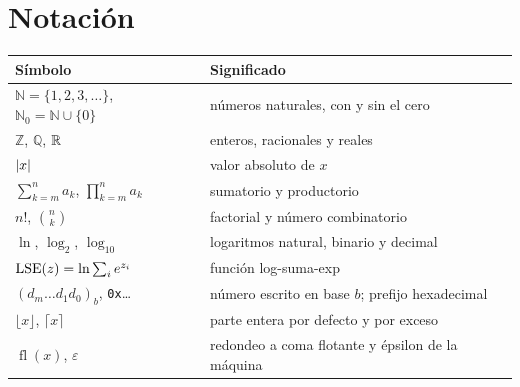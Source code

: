\documentclass[11pt,a4paper,twoside,openany]{book}
\newcommand{\N}{\mathbb{N}}
\newcommand{\Z}{\mathbb{Z}}
\newcommand{\Q}{\mathbb{Q}}
\newcommand{\fl}{\operatorname{fl}}
\begin{document}
\section*{Notación}
\begin{center}
\begin{tabular}{@{}ll@{}}
\toprule
Símbolo & Significado \\
\midrule
$\N=\{1,2,3,\dots\}$, $\N_0=\N\cup\{0\}$ & números naturales, con y sin el cero \\
$\Z$, $\Q$, $\mathbb{R}$ & enteros, racionales y reales \\
$\lvert x\rvert$ & valor absoluto de $x$ \\
$\sum_{k=m}^{n}a_k$, $\prod_{k=m}^{n}a_k$ & sumatorio y productorio \\
$n!$, $\binom{n}{k}$ & factorial y número combinatorio \\
$\ln$, $\log_2$, $\log_{10}$ & logaritmos natural, binario y decimal \\
$\operatorname{LSE}(z)=\ln\sum_i e^{z_i}$ & función log-suma-exp \\
$(d_{m}\dots d_1d_0)_b$, \texttt{0x}\dots & número escrito en base $b$; prefijo hexadecimal \\
$\lfloor x\rfloor$, $\lceil x\rceil$ & parte entera por defecto y por exceso \\
$\fl(x)$, $\varepsilon$ & redondeo a coma flotante y épsilon de la máquina \\
\bottomrule
\end{tabular}
\end{center}


\tableofcontents

\mainmatter







\backmatter

\end{document}
